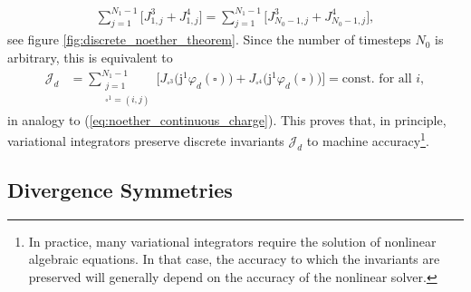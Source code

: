 \documentclass[12pt,a4paper,reqno]{article}
\begin{document}
\begin{align}\label{eq:noether_discrete_conservation_law_2}
  \sum \limits_{j=1}^{N_{1}-1} \Big[ J^{3}_{1,j}       + J^{4}_{1,j}       \Big]
= \sum \limits_{j=1}^{N_{1}-1} \Big[ J^{3}_{N_{0}-1,j} + J^{4}_{N_{0}-1,j} \Big] ,
\end{align}
see figure \ref{fig:discrete_noether_theorem}.
Since the number of timesteps $N_{0}$ is arbitrary, this is equivalent to
\begin{align}\label{eq:noether_discrete_conservation_law_3}
\mathcal{J}_{d} &= \sum \limits_{\substack{j=1\\ \square^{1} = (i,j)}}^{N_{1}-1} \Big[ J_{\square^{3}} \big( {\ensuremath{\mathrm{j}}}^{1} {\ensuremath{\varphi}}_{d} (\square) \big) + J_{\square^{4}} \big( {\ensuremath{\mathrm{j}}}^{1} {\ensuremath{\varphi}}_{d} (\square) \big) \Big] = \text{const. for all $i$} ,
\end{align}
in analogy to (\ref{eq:noether_continuous_charge}).
This proves that, in principle, variational integrators preserve discrete invariants $\mathcal{J}_{d}$ to machine accuracy\footnote{
In practice, many variational integrators require the solution of nonlinear algebraic equations. In that case, the accuracy to which the invariants are preserved will generally depend on the accuracy of the nonlinear solver.
}.

\subsection{Divergence Symmetries}
\label{sec:noether_divergence}
\end{document}
